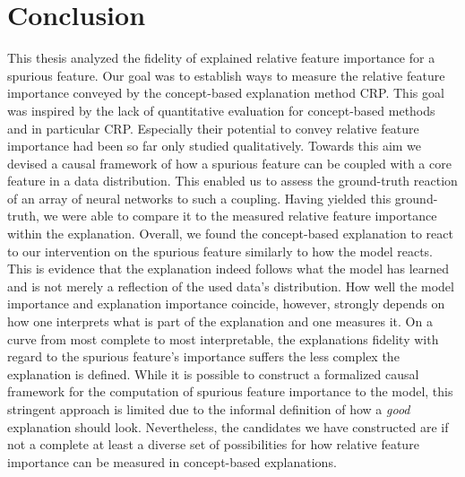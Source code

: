 \section{Conclusion}
This thesis analyzed the fidelity of explained relative feature importance for a spurious feature. 
Our goal was to establish ways to measure the relative feature importance conveyed by the concept-based explanation method CRP. This goal was inspired by the lack of quantitative evaluation for concept-based methods and in particular CRP. Especially their potential to convey relative feature importance had been so far only studied qualitatively. 
Towards this aim we devised a causal framework of how a spurious feature can be coupled with a core feature in a data distribution. This enabled us to assess the ground-truth reaction of an array of neural networks to such a coupling. Having yielded this ground-truth, we were able to compare it to the measured relative feature importance within the explanation. 
Overall, we found the concept-based explanation to react to our intervention on the spurious feature similarly to how the model reacts. This is evidence that the explanation indeed follows what the model has learned and is not merely a reflection of the used data's distribution. 
How well the model importance and explanation importance coincide, however, strongly depends on how one interprets what is part of the explanation and one measures it.
On a curve from most complete to most interpretable, the explanations fidelity with regard to the spurious feature's importance suffers the less complex the explanation is defined. While it is possible to construct a formalized causal framework for the computation of spurious feature importance to the model, this stringent approach is limited due to the informal definition of how a \textit{good} explanation should look. Nevertheless, the candidates we have constructed are if not a complete at least a diverse set of possibilities for how relative feature importance can be measured in concept-based explanations.


